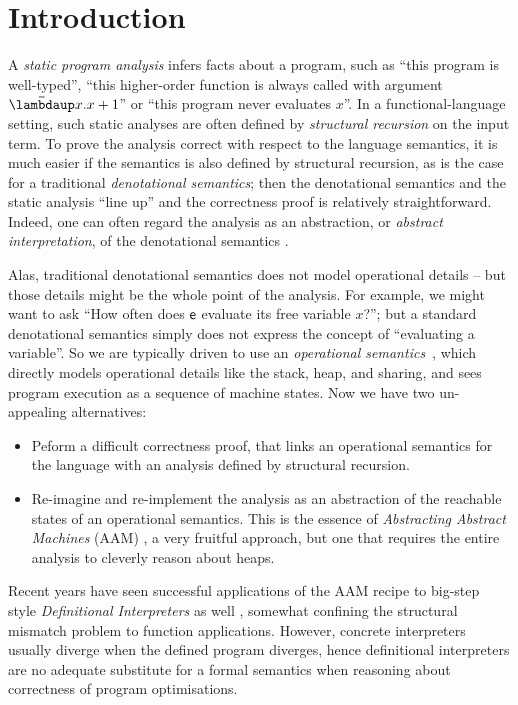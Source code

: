 \section{Introduction}
\label{sec:introduction}

A \emph{static program analysis} infers facts about a program, such
as ``this program is well-typed'', ``this higher-order function is always called
with argument $\Lam{x}{x+1}$'' or ``this program never evaluates $x$''.
In a functional-language setting, such static analyses are
often defined by \emph{structural recursion} on the input term.
To prove the analysis correct with respect to the language semantics,
it is much easier if the semantics is also defined by structural recursion,
as is the case for a traditional \emph{denotational semantics};
then the denotational semantics and the static analysis
``line up'' and the correctness proof is relatively straightforward.
Indeed, one can often regard the analysis as an abstraction, or \emph{abstract interpretation},
of the denotational semantics \cite{Cousot:21}.

Alas, traditional denotational semantics does not
model operational details -- but those details might be the whole point of the analysis.  For example,
we might want to ask ``How often does $\mathsf{e}$ evaluate its free variable $x$?'';
but a standard denotational semantics simply does not express the concept of ``evaluating a variable''.
So we are typically driven to use an \emph{operational semantics}~\citep{Plotkin:81}, which directly
models operational details like the stack, heap, and sharing, and sees program execution
as a sequence of machine states.  Now we have two un-appealing alternatives:
\begin{itemize}
\item Peform a difficult correctness proof, that links an operational semantics for the language
  with an analysis defined by structural recursion.
\item Re-imagine and re-implement the analysis as an abstraction of the
  reachable states of an operational semantics.
  This is the essence of \emph{Abstracting Abstract Machines} (AAM) \cite{aam},
  a very fruitful approach, but one that requires the entire analysis to
  cleverly reason about heaps.
\end{itemize}

Recent years have seen successful applications of the AAM recipe to big-step
style \emph{Definitional Interpreters} as well \cite{Reynolds:72,adi},
somewhat confining the structural mismatch problem to function applications.
However, concrete interpreters usually diverge when the defined program
diverges, hence definitional interpreters are no adequate substitute for a
formal semantics when reasoning about correctness of program optimisations.

